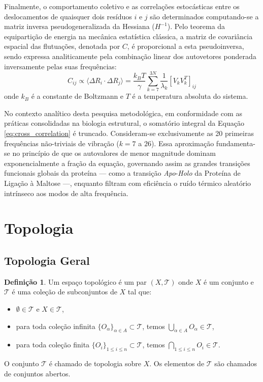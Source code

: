 \documentclass[12pt, a4paper]{article}
\theoremstyle{plain}
\theoremstyle{definition}
\newtheorem{definition}{Definição}[section]
\theoremstyle{remark}
\newcommand{\ident}{\hspace{2em}}
\begin{document}
\ident Finalmente, o comportamento coletivo e as correlações estocásticas entre os deslocamentos de quaisquer dois resíduos $i$ e $j$ são determinados computando-se a matriz inversa pseudogeneralizada da Hessiana ($H^{-1}$). Pelo teorema da equipartição de energia na mecânica estatística clássica, a matriz de covariância espacial das flutuações, denotada por $C$, é proporcional a esta pseudoinversa, sendo expressa analiticamente pela combinação linear dos autovetores ponderada inversamente pelas suas frequências:
\begin{equation}
    C_{ij} \propto \langle \Delta R_i \cdot \Delta R_j \rangle = \frac{k_B T}{\gamma} \sum_{k=7}^{3N} \frac{1}{\lambda_k} \left[ V_k V_k^T \right]_{ij} \label{eq:cross_correlation}
\end{equation}
onde $k_B$ é a constante de Boltzmann e $T$ é a temperatura absoluta do sistema. 

\ident No contexto analítico desta pesquisa metodológica, em conformidade com as práticas consolidadas na biologia estrutural, o somatório integral da Equação \ref{eq:cross_correlation} é truncado. Consideram-se exclusivamente as 20 primeiras frequências não-triviais de vibração ($k = 7$ a $26$). Essa aproximação fundamenta-se no princípio de que os autovalores de menor magnitude dominam exponencialmente a fração da equação, governando assim as grandes transições funcionais globais da proteína — como a transição \textit{Apo}-\textit{Holo} da Proteína de Ligação à Maltose —, enquanto filtram com eficiência o ruído térmico aleatório intrínseco aos modos de alta frequência.

\section{Topologia} \label{apx:topologia}
\subsection{Topologia Geral}
\begin{definition}
Um espaço topológico é um par $(X, \mathcal{T})$ onde $X$ é um conjunto e $\mathcal{T}$ é uma coleção de subconjuntos de $X$ tal que:
\begin{itemize}
    \item $\emptyset \in \mathcal{T}$ e $X \in \mathcal{T}$,
    \item para toda coleção infinita $\{O_\alpha\}_{\alpha \in A} \subset \mathcal{T}$, temos $\bigcup_{\alpha \in A} O_\alpha \in \mathcal{T}$,
    \item para toda coleção finita $\{O_i\}_{1 \leq i \leq n} \subset \mathcal{T}$, temos $\bigcap_{1 \leq i \leq n} O_i \in \mathcal{T}$.
\end{itemize}
O conjunto $\mathcal{T}$ é chamado de topologia sobre $X$. Os elementos de $\mathcal{T}$ são chamados de conjuntos abertos.
\end{definition}
\end{document}
